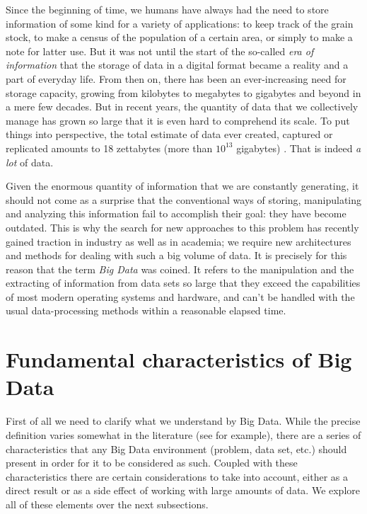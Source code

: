 %
%
%

Since the beginning of time, we humans have always had the need to store information of some kind for a variety of applications: to keep track of the grain stock, to make a census of the population of a certain area, or simply to make a note for latter use. But it was not until the start of the so-called \textit{era of information} that the storage of data in a digital format became a reality and a part of everyday life. From then on, there has been an ever-increasing need for storage capacity, growing from kilobytes to megabytes to gigabytes and beyond in a mere few decades. But in recent years, the quantity of data that we collectively manage has grown so large that it is even hard to comprehend its scale. To put things into perspective, the total estimate of data ever created, captured or replicated amounts to 18 zettabytes (more than $10^{13}$ gigabytes) \cite{rydning2018digitization}. That is indeed \textit{a lot} of data.

Given the enormous quantity of information that we are constantly generating, it should not come as a surprise that the conventional ways of storing, manipulating and analyzing this information fail to accomplish their goal: they have become outdated. This is why the search for new approaches to this problem has recently gained traction in industry as well as in academia; we require new architectures and methods for dealing with such a big volume of data. It is precisely for this reason that the term \textit{Big Data} was coined. It refers to the manipulation and the extracting of information from data sets so large that they exceed the capabilities of most modern operating systems and hardware, and can't be handled with the usual data-processing methods within a reasonable elapsed time.

\section{Fundamental characteristics of Big Data}

First of all we need to clarify what we understand by Big Data. While the precise definition varies somewhat in the literature (see \cite{kitchin2016big} for example), there are a series of characteristics that any Big Data environment (problem, data set, etc.) should present in order for it to be considered as such. Coupled with these characteristics there are certain considerations to take into account, either as a direct result or as a side effect of working with large amounts of data. We explore all of these elements over the next subsections.

